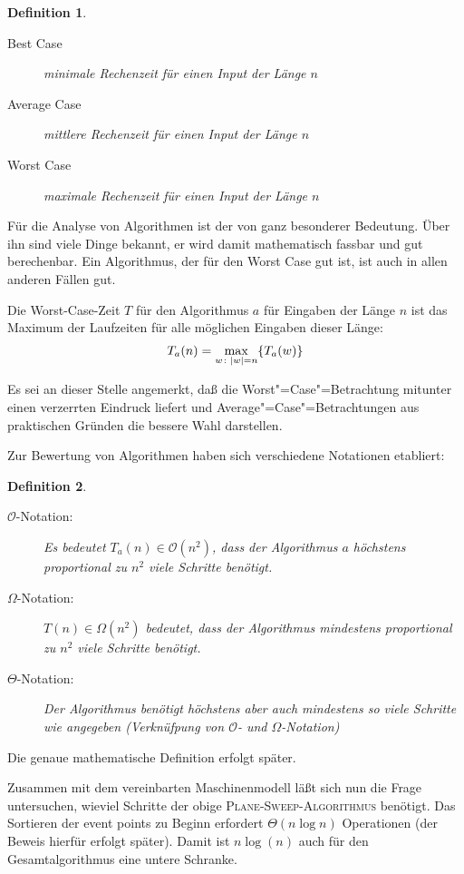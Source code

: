 \documentclass[ngerman,draft,parskip=half*,twoside]{scrreprt}
\theoremstyle{break}
\newtheorem{definition}{Definition}[chapter]
\theoremstyle{nonumberbreak}
\newcommand*{\OO}{\mathcal{O}}      %
\DeclarePairedDelimiter{\abs}{\lvert}{\rvert}
\newcommand*{\highl}[2][]{\textbf{\boldmath{#2}}%
  \ifthenelse{\equal{#1}{}}{\index{#2}}{\index{#1}}%
}
\begin{document}
\begin{definition}
  \begin{description}
   \item[Best Case] minimale Rechenzeit für einen Input der Länge $n$
   \item[Average Case] mittlere Rechenzeit für einen Input der Länge $n$
   \item[Worst Case] maximale Rechenzeit für einen Input der Länge $n$
  \end{description}
\end{definition}

Für die Analyse von Algorithmen ist der \highl{Worst Case} von ganz
besonderer Bedeutung. Über ihn sind viele Dinge bekannt, er wird
damit mathematisch fassbar und gut berechenbar. Ein Algorithmus,
der für den Worst Case gut ist, ist auch in allen anderen Fällen gut.

Die Worst-Case-Zeit $T$ für den Algorithmus $a$ für Eingaben der Länge $n$
ist das Maximum der Laufzeiten für alle möglichen Eingaben dieser
Länge:
\begin{gather*}
  T_a(n) = \max_{w\colon \abs{w}=n}\{T_a(w)\}
\end{gather*}

Es sei an dieser Stelle angemerkt, daß die Worst"=Case"=Betrachtung mitunter
einen verzerrten Eindruck liefert und Average"=Case"=Betrachtungen aus
praktischen Gründen die bessere Wahl darstellen.

Zur Bewertung von Algorithmen haben sich verschiedene Notationen
etabliert:
\begin{definition}
  \begin{description}
   \item[$\OO$-Notation:]
    Es bedeutet $T_a(n) \in \OO(n^2)$, dass der Algorithmus $a$
    \emph{höchstens} proportional zu $n^2$ viele Schritte benötigt. 
   \item[$\Omega$-Notation:]
    $T(n) \in \Omega (n^2)$ bedeutet, dass der Algorithmus \emph{mindestens}
    proportional zu $n^2$ viele Schritte benötigt. 
   \item[$\Theta$-Notation:]
    Der Algorithmus benötigt höchstens aber auch mindestens so viele
    Schritte wie angegeben (Verknüfpung von $\OO$- und $\Omega$-Notation)
  \end{description}
\end{definition}
Die genaue mathematische Definition erfolgt später.

Zusammen mit dem vereinbarten
Maschinenmodell läßt sich nun die Frage untersuchen, wieviel Schritte
der obige \textsc{Plane-Sweep-Algorithmus} benötigt.
Das Sortieren der event points zu Beginn erfordert $\Theta(n\log n)$
Operationen (der Beweis hierfür erfolgt später). Damit ist $n\log(n)$
auch für den Gesamtalgorithmus eine untere Schranke.
\end{document}
